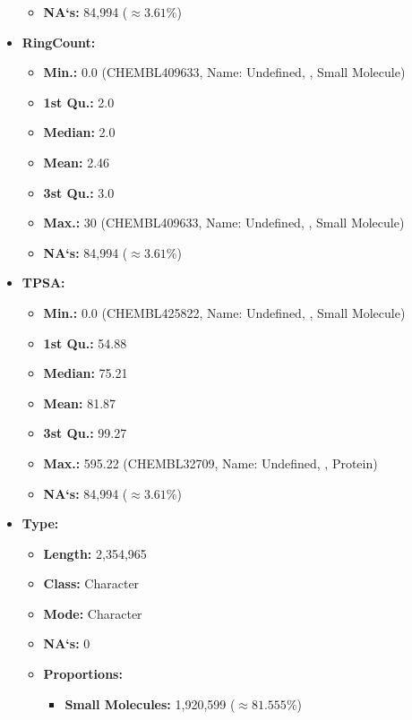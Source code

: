 \documentclass[10pt]{article}
\begin{document}
\begin{itemize}
\begin{itemize}
        \item \textbf{NA`s:} 84,994 ($\approx 3.61\% $)
    \end{itemize}
    \item \textbf{RingCount:}
    \begin{itemize}
        \item \textbf{Min.:} 0.0 (CHEMBL409633, Name: Undefined,  , Small Molecule)
        \item \textbf{1st Qu.:} 2.0
        \item \textbf{Median:} 2.0
        \item \textbf{Mean:} 2.46
        \item \textbf{3st Qu.:} 3.0
        \item \textbf{Max.:} 30 (CHEMBL409633, Name: Undefined, , Small Molecule)
        \item \textbf{NA`s:} 84,994 ($\approx 3.61\% $)
    \end{itemize}
     \item \textbf{TPSA:}
    \begin{itemize}
        \item \textbf{Min.:} 0.0 (CHEMBL425822, Name: Undefined,  , Small Molecule)
        \item \textbf{1st Qu.:} 54.88
        \item \textbf{Median:} 75.21
        \item \textbf{Mean:} 81.87
        \item \textbf{3st Qu.:} 99.27
        \item \textbf{Max.:} 595.22 (CHEMBL32709, Name: Undefined, , Protein)
        \item \textbf{NA`s:} 84,994 ($\approx 3.61\% $)
    \end{itemize}
    \item \textbf{Type:}
    \begin{itemize}
        \item \textbf{Length:} 2,354,965
        \item \textbf{Class:} Character
        \item \textbf{Mode:} Character
        \item \textbf{NA`s:} 0
        \item \textbf{Proportions:}
        \begin{multicols}{2}
            \begin{itemize}
                \item \textbf{Small Molecules:} 1,920,599 ($\approx 81.555\% $)

\end{itemize}
\end{multicols}
\end{itemize}
\end{itemize}
\end{document}
